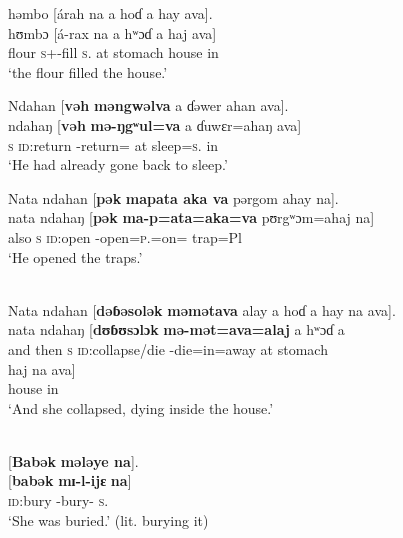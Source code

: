 \medskip
həmbo  [árah  na  a  hoɗ  a  hay  ava].\\
\gll  hʊmbɔ [á-rax na a hʷɔɗ a haj ava]\\
      flour  \textsc{s}+{\IFV}-fill  \textsc{s}.{\DO}  at       stomach  {\GEN}   house  in\\
\glt  ‘the flour filled the house.’
\z

\ea \label{ex:8:41}
Ndahan  [\textbf{vəh}  \textbf{məngwəlva}  a  ɗəwer  ahan  ava].\\
\gll  ndahaŋ  [\textbf{vəh}    \textbf{mə-ŋgʷul=va}    a  ɗuwɛr=ahaŋ    ava]\\
      \textsc{s}    \textsc{id}:return    {\NOM}{}-return={\PRF}  at  sleep=\textsc{s}.{\POSS}  in\\
\glt  ‘He had already gone back to sleep.’
\z

\ea \label{ex:8:42}
Nata  ndahan  [\textbf{pək}  \textbf{mapata  aka  va}  pərgom  ahay  na].\\
\gll  nata    ndahaŋ  [\textbf{pək}  \textbf{ma-p=ata=aka=va}    pʊrgʷɔm=ahaj  na]\\
      also    \textsc{s}  \textsc{id}:open  {\NOM}{}-open=\textsc{p}.{\IO}=on={\PRF}  trap=Pl  {\PSP}\\
\glt  ‘He opened the traps.’ 
\z

\ea \label{ex:8:43}\\
Nata  ndahan  [\textbf{dəɓəsolək} \textbf{məmətava}  alay  a  hoɗ  a  hay  na  ava].\\
\gll  nata    ndahaŋ  [\textbf{dʊɓʊsɔlɔk}   \textbf{mə-mət=ava=alaj}   a   hʷɔɗ      a\\ 
      {and then}  \textsc{s}   \textsc{id}:collapse/die  {\NOM}{}-die=in=away   at   stomach  {\GEN}\\  
      
      \medskip
\gll haj na ava]\\
     house   {\PSP}    in\\
\glt  ‘And she collapsed, dying inside the house.’
\z

\ea \label{ex:8:44}\\
{}[\textbf{Babək} \textbf{mələye  na}].\\
\gll  {}[\textbf{babək} \textbf{mɪ-l-ijɛ}  \textbf{na}]\\
      \textsc{id}:bury      {\NOM}-bury-{\CL}   \textsc{s}.{\DO}\\
\glt  ‘She was buried.’ (lit. burying it)
\z

